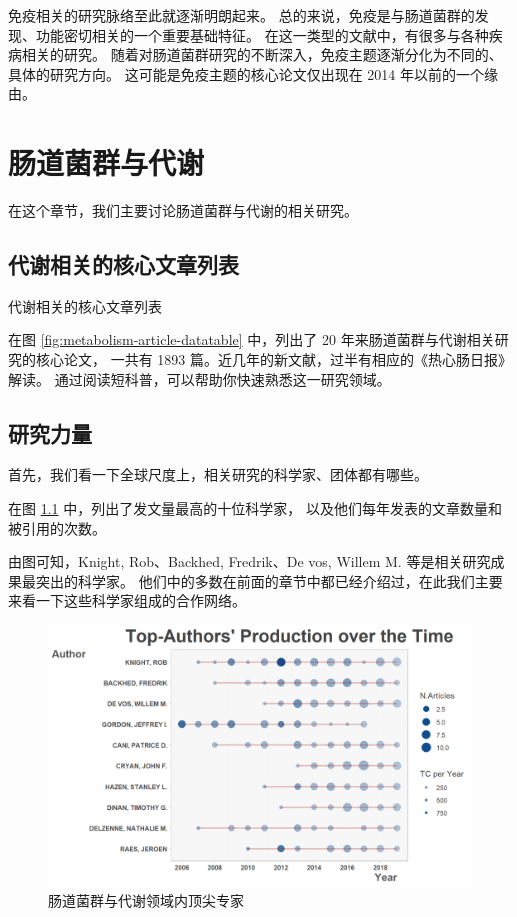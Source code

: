 \documentclass[]{ctexbook}
\begin{document}
免疫相关的研究脉络至此就逐渐明朗起来。
总的来说，免疫是与肠道菌群的发现、功能密切相关的一个重要基础特征。
在这一类型的文献中，有很多与各种疾病相关的研究。
随着对肠道菌群研究的不断深入，免疫主题逐渐分化为不同的、具体的研究方向。
这可能是免疫主题的核心论文仅出现在 2014 年以前的一个缘由。

\hypertarget{metabolism}{%
\chapter{肠道菌群与代谢}\label{metabolism}}

在这个章节，我们主要讨论肠道菌群与代谢的相关研究。

\hypertarget{ux4ee3ux8c22ux76f8ux5173ux7684ux6838ux5fc3ux6587ux7ae0ux5217ux8868}{%
\section{代谢相关的核心文章列表}\label{ux4ee3ux8c22ux76f8ux5173ux7684ux6838ux5fc3ux6587ux7ae0ux5217ux8868}}

\hypertarget{htmlwidget-5975783946f5ed0d868d}{}

\label{fig:metabolism-article-datatable}代谢相关的核心文章列表

在图 \ref{fig:metabolism-article-datatable} 中，列出了 20 年来肠道菌群与代谢相关研究的核心论文，
一共有 1893 篇。近几年的新文献，过半有相应的《热心肠日报》解读。
通过阅读短科普，可以帮助你快速熟悉这一研究领域。

\hypertarget{ux7814ux7a76ux529bux91cf-1}{%
\section{研究力量}\label{ux7814ux7a76ux529bux91cf-1}}

首先，我们看一下全球尺度上，相关研究的科学家、团体都有哪些。

在图 \ref{fig:metabolism-article-top-author} 中，列出了发文量最高的十位科学家，
以及他们每年发表的文章数量和被引用的次数。

由图可知，Knight, Rob、Backhed, Fredrik、De vos, Willem M. 等是相关研究成果最突出的科学家。
他们中的多数在前面的章节中都已经介绍过，在此我们主要来看一下这些科学家组成的合作网络。

\begin{figure}
\includegraphics[width=1\linewidth]{plots/metabolism-article-top-author-1} \caption{肠道菌群与代谢领域内顶尖专家}\label{fig:metabolism-article-top-author}
\end{figure}
\end{document}
